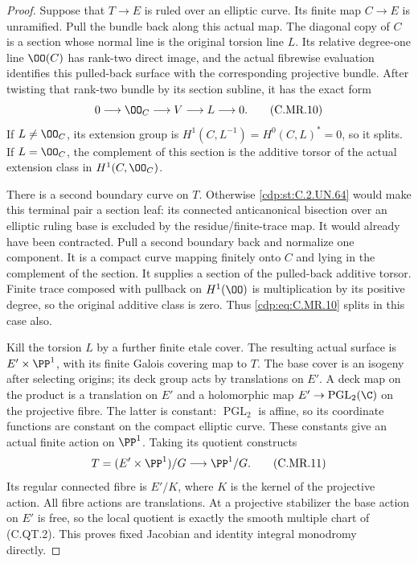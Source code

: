 \begin{proof}
Suppose that $T\to E$ is ruled over an elliptic
curve. Its finite map $C\to E$ is unramified.
Pull the bundle back along this actual map.
The diagonal copy of $C$ is a section whose
normal line is the original torsion line $L$.
Its relative degree-one line $\OO(C)$ has
rank-two direct image, and the actual
fibrewise evaluation identifies this
pulled-back surface with the corresponding
projective bundle. After twisting that
rank-two bundle by its section subline,
it has the exact form
\[
     0\longrightarrow\OO_C\longrightarrow V
                         \longrightarrow L\longrightarrow0.
\tag{C.MR.10}\label{cdp:eq:C.MR.10}
\]
If $L\ne\OO_C$, its extension group is
$H^1(C,L^{-1})=H^0(C,L)^*=0$, so it splits.
If $L=\OO_C$, the complement of this section
is the additive torsor of the actual extension
class in $H^1(C,\OO_C)$.

There is a second boundary curve on $T$.
Otherwise \ref{cdp:st:C.2.UN.64} would make this terminal pair
a section leaf: its connected anticanonical
bisection over an elliptic ruling base is
excluded by the residue/finite-trace map.
It would already have been contracted.
Pull a second boundary back and normalize
one component. It is a compact curve mapping
finitely onto $C$ and lying in the complement
of the section. It supplies a section of
the pulled-back additive torsor. Finite
trace composed with pullback on $H^1(\OO)$
is multiplication by its positive degree,
so the original additive class is zero.
Thus \eqref{cdp:eq:C.MR.10} splits in this case also.

Kill the torsion $L$ by a further finite
etale cover. The resulting actual surface
is $E'\times\PP^1$, with its finite Galois
covering map to $T$. The base cover is
an isogeny after selecting origins; its
deck group acts by translations on $E'$.
A deck map on the product is a translation
on $E'$ and a holomorphic map
$E'\to\operatorname{PGL}_2(\C)$ on the
projective fibre. The latter is constant:
$\operatorname{PGL}_2$ is affine, so its
coordinate functions are constant on the
compact elliptic curve. These constants
give an actual finite action on $\PP^1$.
Taking its quotient constructs
\[
        T=(E'\times\PP^1)/G
                         \longrightarrow\PP^1/G.
\tag{C.MR.11}\label{cdp:eq:C.MR.11}
\]
Its regular connected fibre is $E'/K$,
where $K$ is the kernel of the projective
action. All fibre actions are translations.
At a projective stabilizer the base action
on $E'$ is free, so the local quotient
is exactly the smooth multiple chart
of (C.QT.2). This proves fixed Jacobian
and identity integral monodromy directly.


\end{proof}
